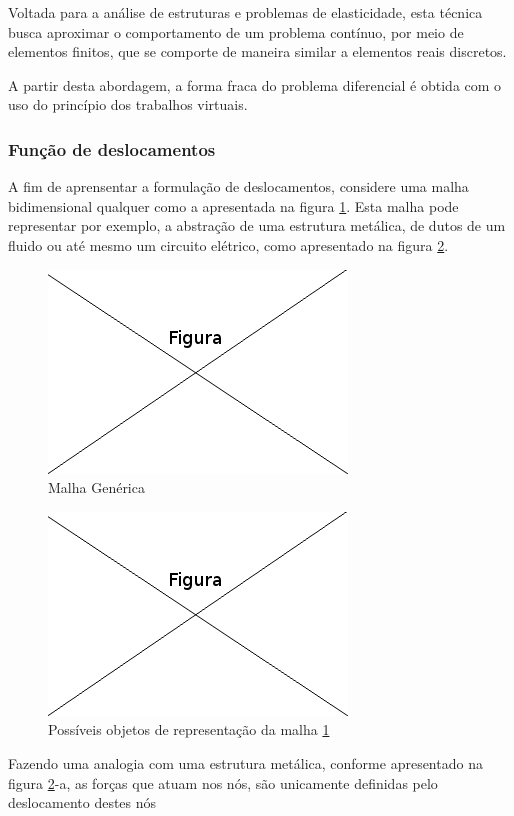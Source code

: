 Voltada para a análise de estruturas e problemas de elasticidade, esta técnica busca aproximar o comportamento de um problema contínuo, por meio de elementos finitos, que se comporte de maneira similar a elementos reais discretos.
\citep[p. 19]{zien}

A partir desta abordagem, a forma fraca do problema diferencial é obtida com o uso do princípio dos trabalhos virtuais.
\citep[p. 20]{zien}

 


\subsubsection{Função de deslocamentos}

A fim de aprensentar a formulação de deslocamentos, considere uma malha bidimensional qualquer como a apresentada na figura \ref{fig:malhaGenerica}. Esta malha pode representar por exemplo, a abstração de uma estrutura metálica, de dutos de um fluido ou até mesmo um circuito elétrico, como apresentado na figura \ref{fig:repMalhaGenerica}.
\begin{figure}[!htb]
\centering
\includegraphics[scale=0.5]{figuras/temp.png}
\caption{Malha Genérica}
\label{fig:malhaGenerica}
\end{figure}

\begin{figure}[!htb]
\centering
\includegraphics[scale=0.5]{figuras/temp.png}
\caption{Possíveis objetos de representação da malha \ref{fig:malhaGenerica}}
\label{fig:repMalhaGenerica}
\end{figure}


 Fazendo uma analogia com uma estrutura metálica, conforme apresentado na figura \ref{fig:repMalhaGenerica}-a, as forças que atuam nos nós, são unicamente definidas pelo deslocamento destes nós 
